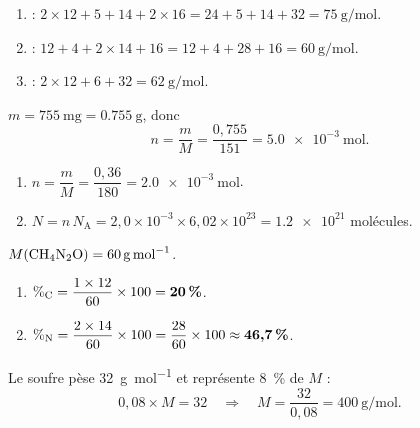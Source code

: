 \documentclass[11pt,a4paper]{article}
\begin{document}
\begin{corrige}
\begin{enumerate}[label=\alph*)]
  \item {} : $2\times12+5+14+2\times16=24+5+14+32=\qty{75}{\gram\per\mole}$.
  \item {} : $12+4+2\times14+16=12+4+28+16=\qty{60}{\gram\per\mole}$.
  \item {} : $2\times12+6+32=\qty{62}{\gram\per\mole}$.
\end{enumerate}
\end{corrige}

\begin{corrige}[Nombre de moles $n=m/M$]
$m=\qty{755}{\milli\gram}=\qty{0.755}{\gram}$, donc
\[
n=\frac{m}{M}=\frac{0,755}{151}=\qty{5.0e-3}{\mole}.
\]
\end{corrige}

\begin{corrige}[Nombre de molécules $N=n\,N_{\mathrm{A}}$]
\begin{enumerate}[label=\alph*)]
  \item $n=\dfrac{m}{M}=\dfrac{0,36}{180}=\qty{2.0e-3}{\mole}$.
  \item $N=n\,N_{\mathrm{A}}=2{,}0\times10^{-3}\times6{,}02\times10^{23}=\num{1.2e21}$ molécules.
\end{enumerate}
\end{corrige}

\begin{corrige}
$M(\ce{CH4N2O})=\qty{60}{\gram\per\mole}$.
\begin{enumerate}[label=\alph*)]
  \item $\%_{\ce{C}}=\dfrac{1\times12}{60}\times100=\textbf{20\,\%}$.
  \item $\%_{\ce{N}}=\dfrac{2\times14}{60}\times100=\dfrac{28}{60}\times100\approx\textbf{46{,}7\,\%}$.
\end{enumerate}
\end{corrige}

\begin{corrige}
Le soufre pèse \qty{32}{\gram\per\mole} et représente \qty{8}{\percent} de $M$ :
\[
0{,}08\times M = 32 \quad\Rightarrow\quad M=\frac{32}{0{,}08}=\qty{400}{\gram\per\mole}.
\]
\end{corrige}
\end{document}
